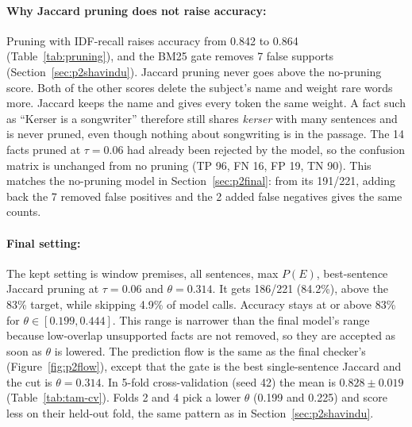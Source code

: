 \documentclass[12pt,a4paper]{article}
\begin{document}
\paragraph{Why Jaccard pruning does not raise accuracy:} Pruning with IDF-recall raises accuracy from 0.842 to 0.864 (Table~\ref{tab:pruning}), and the BM25 gate removes 7 false supports (Section~\ref{sec:p2shavindu}). Jaccard pruning never goes above the no-pruning score. Both of the other scores delete the subject's name and weight rare words more. Jaccard keeps the name and gives every token the same weight. A fact such as ``Kerser is a songwriter'' therefore still shares \textit{kerser} with many sentences and is never pruned, even though nothing about songwriting is in the passage. The 14 facts pruned at $\tau = 0.06$ had already been rejected by the model, so the confusion matrix is unchanged from no pruning (TP 96, FN 16, FP 19, TN 90). This matches the no-pruning model in Section~\ref{sec:p2final}: from its 191/221, adding back the 7 removed false positives and the 2 added false negatives gives the same counts.

\paragraph{Final setting:} The kept setting is window premises, all sentences, max $P(E)$, best-sentence Jaccard pruning at $\tau = 0.06$ and $\theta = 0.314$. It gets 186/221 (84.2\%), above the 83\% target, while skipping 4.9\% of model calls. Accuracy stays at or above 83\% for $\theta \in [0.199, 0.444]$. This range is narrower than the final model's range because low-overlap unsupported facts are not removed, so they are accepted as soon as $\theta$ is lowered. The prediction flow is the same as the final checker's (Figure~\ref{fig:p2flow}), except that the gate is the best single-sentence Jaccard and the cut is $\theta = 0.314$. In 5-fold cross-validation (seed 42) the mean is $0.828 \pm 0.019$ (Table~\ref{tab:tam-cv}). Folds 2 and 4 pick a lower $\theta$ (0.199 and 0.225) and score less on their held-out fold, the same pattern as in Section~\ref{sec:p2shavindu}.
\end{document}
